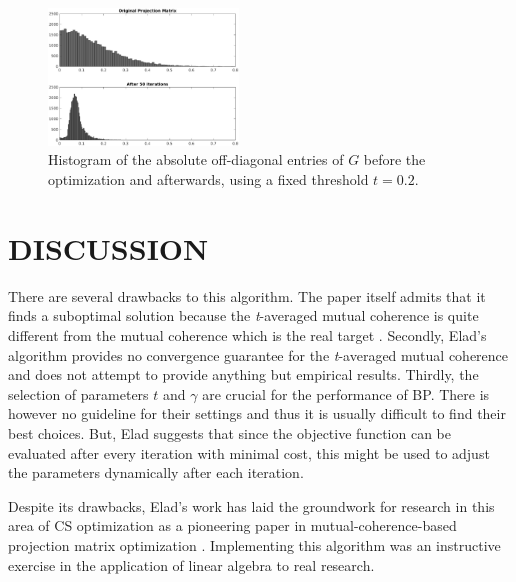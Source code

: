\documentclass[journal]{IEEEtran}
\begin{document}
\begin{figure}[]
  \centering
  \includegraphics[width=0.45\textwidth]{hist_bw.eps}
  \caption{Histogram of the absolute off-diagonal entries of $G$ before the optimization and afterwards, using a fixed threshold $t = 0.2$.}
  \label{fig:hist}
\end{figure}

\section{DISCUSSION}

There are several drawbacks to this algorithm.  The paper itself admits that it finds a suboptimal solution because the \emph{t}-averaged mutual coherence is quite different from the mutual coherence which is the real target \cite{lin}.  Secondly, Elad's algorithm provides no convergence guarantee for the \emph{t}-averaged mutual coherence and does not attempt to provide anything but empirical results.  Thirdly, the selection of parameters $t$ and $\gamma$ are crucial for the performance of BP.  There is however no guideline for their settings and thus it is usually difficult to find their best choices.  But, Elad suggests that since the objective function can be evaluated after every iteration with minimal cost, this might be used to adjust the parameters dynamically after each iteration.

Despite its drawbacks, Elad's work has laid the groundwork for research in this area of CS optimization as a pioneering paper in mutual-coherence-based projection matrix optimization \cite{tcs}.  Implementing this algorithm was an instructive exercise in the application of linear algebra to real research.


{}
\end{document}

